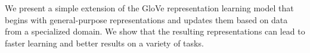 We present a simple extension of the GloVe representation learning model that begins with general-purpose representations and updates them based on data from a specialized domain. We show that the resulting representations can lead to faster learning and better results on a variety of tasks.
